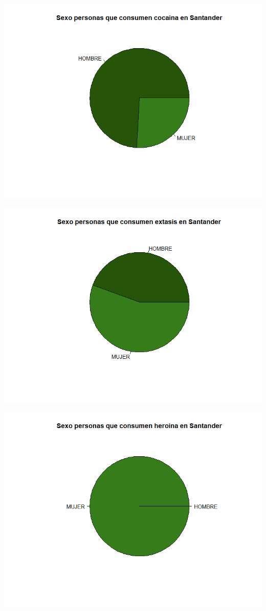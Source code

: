 \documentclass[
]{article}
\begin{document}
\includegraphics{images/cocaina S santander.png}

\includegraphics{images/extasis S santander.png}

\includegraphics{images/heroina S santander.png}
\end{document}

